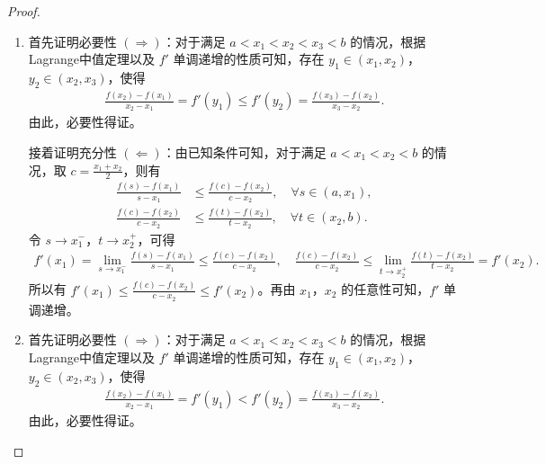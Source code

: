\documentclass[../../main.tex]{subfiles}%
\begin{document}
\begin{proof}
\begin{enumerate}[(1)]
\item 首先证明必要性 $(\Rightarrow)$：对于满足 $a < x_1 < x_2 < x_3 < b$ 的情况，根据Lagrange中值定理以及 $f'$ 单调递增的性质可知，存在 $y_1 \in (x_1, x_2)$，$y_2 \in (x_2, x_3)$，使得
\begin{align*}
\frac{f(x_2) - f(x_1)}{x_2 - x_1} = f'(y_1) \leqslant f'(y_2) = \frac{f(x_3) - f(x_2)}{x_3 - x_2}.
\end{align*}
由此，必要性得证。

接着证明充分性 $(\Leftarrow)$：由已知条件可知，对于满足 $a < x_1 < x_2 < b$ 的情况，取 $c = \frac{x_1 + x_2}{2}$，则有
\begin{align*}
\frac{f(s) - f(x_1)}{s - x_1} &\leqslant \frac{f(c) - f(x_2)}{c - x_2}, \quad \forall s \in (a, x_1), \\
\frac{f(c) - f(x_2)}{c - x_2} &\leqslant \frac{f(t) - f(x_2)}{t - x_2}, \quad \forall t \in (x_2, b).
\end{align*}
令 $s \to x_1^-$，$t \to x_2^+$，可得
\begin{align*}
f'(x_1) = \lim_{s \to x_1^-} \frac{f(s) - f(x_1)}{s - x_1} \leqslant \frac{f(c) - f(x_2)}{c - x_2}, \quad
\frac{f(c) - f(x_2)}{c - x_2} \leqslant \lim_{t \to x_2^+} \frac{f(t) - f(x_2)}{t - x_2} = f'(x_2).
\end{align*}
所以有 $f'(x_1) \leqslant \frac{f(c) - f(x_2)}{c - x_2} \leqslant f'(x_2)$。再由 $x_1$，$x_2$ 的任意性可知，$f'$ 单调递增。


\item 首先证明必要性 $(\Rightarrow)$：对于满足 $a < x_1 < x_2 < x_3 < b$ 的情况，根据Lagrange中值定理以及 $f'$ 单调递增的性质可知，存在 $y_1 \in (x_1, x_2)$，$y_2 \in (x_2, x_3)$，使得
\begin{align*}
\frac{f(x_2) - f(x_1)}{x_2 - x_1} = f'(y_1)<f'(y_2) = \frac{f(x_3) - f(x_2)}{x_3 - x_2}.
\end{align*}
由此，必要性得证。


\end{enumerate}
\end{proof}
\end{document}
